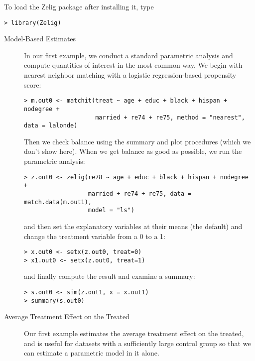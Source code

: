 To load the Zelig package after installing it, type
\begin{verbatim}
> library(Zelig)
\end{verbatim}

\begin{description}
\item[Model-Based Estimates] In our first example, we conduct a
  standard parametric analysis and compute quantities of interest in
  the most common way.  We begin with nearest neighbor matching with a
  logistic regression-based propensity score:
\begin{verbatim}
> m.out0 <- matchit(treat ~ age + educ + black + hispan + nodegree + 
                    married + re74 + re75, method = "nearest", data = lalonde)
\end{verbatim}
  Then we check balance using the summary and plot procedures (which
  we don't show here).  When we get balance as good as possible, we
  run the parametric analysis:
\begin{verbatim}
> z.out0 <- zelig(re78 ~ age + educ + black + hispan + nodegree + 
                  married + re74 + re75, data = match.data(m.out1), 
                  model = "ls")
\end{verbatim}
  and then set the explanatory variables at their means (the default)
  and change the treatment variable from a 0 to a 1:
\begin{verbatim}
> x.out0 <- setx(z.out0, treat=0)
> x1.out0 <- setx(z.out0, treat=1)
\end{verbatim}
and finally compute the result and examine a summary:
\begin{verbatim}
> s.out0 <- sim(z.out1, x = x.out1)
> summary(s.out0)
\end{verbatim}

\item[Average Treatment Effect on the Treated] Our first example
  estimates the average treatment effect on the treated, and is useful
  for datasets with a sufficiently large control group so that we can
  estimate a parametric model in it alone.


\end{description}

